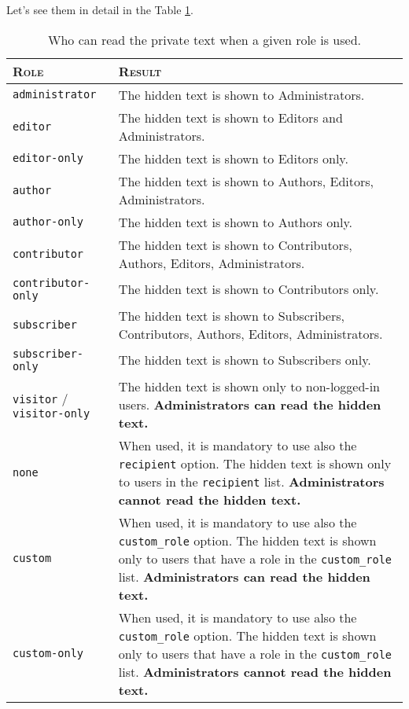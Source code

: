 \documentclass[a4paper,10pt]{article}
\begin{document}
Let's see them in detail in the Table \ref{table:roles}.

\begin{table}
 \centering
 \begin{tabular}[t]{l p{7cm}}
 \toprule
 \textsc{Role} & \textsc{Result} \\
 \midrule
 \verb+administrator+ & The hidden text is shown to Administrators. \\
 \verb+editor+ & The hidden text is shown to Editors and Administrators. \\
 \verb+editor-only+ & The hidden text is shown to Editors only. \\
 \verb+author+ & The hidden text is shown to Authors, Editors, Administrators. \\
 \verb+author-only+ & The hidden text is shown to Authors only. \\
 \verb+contributor+ & The hidden text is shown to Contributors, Authors, Editors, Administrators. \\
 \verb+contributor-only+ & The hidden text is shown to Contributors only. \\
 \verb+subscriber+ & The hidden text is shown to Subscribers, Contributors, Authors, Editors, Administrators. \\
 \verb+subscriber-only+ & The hidden text is shown to Subscribers only. \\
 \verb+visitor+ / \verb+visitor-only+ & The hidden text is shown only to non-logged-in users. \textbf{Administrators can read the hidden text.} \\
 \verb+none+ & When used, it is mandatory to use also the \verb+recipient+ option. The hidden text is shown only to users in the \verb+recipient+ list. \textbf{Administrators cannot read the hidden text.} \\
 \verb+custom+ & When used, it is mandatory to use also the \verb+custom_role+ option. The hidden text is shown only to users that have a role in the \verb+custom_role+ list. \textbf{Administrators can read the hidden text.} \\
 \verb+custom-only+ & When used, it is mandatory to use also the \verb+custom_role+ option. The hidden text is shown only to users that have a role in the \verb+custom_role+ list. \textbf{Administrators cannot read the hidden text.} \\
 \bottomrule
 \end{tabular}
 \caption{Who can read the private text when a given role is used.}
 \label{table:roles}
\end{table}
\end{document}
